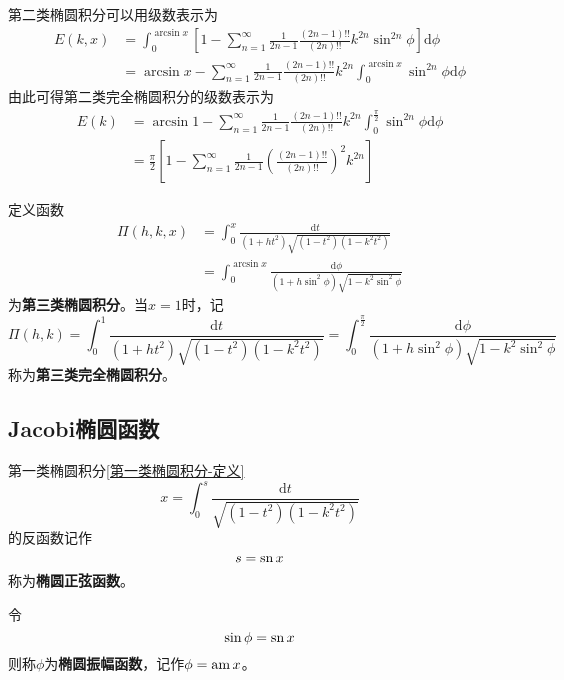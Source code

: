 第二类椭圆积分可以用级数表示为
\begin{align}
	E(k,x) & = \int_0^{\arcsin x} \left[1-\sum_{n=1}^\infty \frac{1}{2n-1}\frac{(2n-1)!!}{(2n)!!}k^{2n}\sin^{2n}\phi\right]\mathrm{d}\phi \nonumber \\
	& = \arcsin x - \sum_{n=1}^\infty \frac{1}{2n-1}\frac{(2n-1)!!}{(2n)!!}k^{2n}\int_0^{\arcsin x} \sin^{2n}\phi \mathrm{d}\phi
	\label{第二类椭圆积分-级数表示}
\end{align}
由此可得第二类完全椭圆积分的级数表示为
\begin{align}
	E(k) & = \arcsin 1 - \sum_{n=1}^\infty \frac{1}{2n-1}\frac{(2n-1)!!}{(2n)!!}k^{2n}\int_0^{\frac{\pi}{2}} \sin^{2n}\phi \mathrm{d}\phi \nonumber \\
	& = \frac{\pi}{2}\left[1-\sum_{n=1}^\infty \frac{1}{2n-1}\left(\frac{(2n-1)!!}{(2n)!!}\right)^2k^{2n}\right]
	\label{chp6:第二类完全椭圆积分-级数表示}
\end{align}

定义函数
\begin{align}
	\varPi(h,k,x) & = \int_0^x \frac{\mathrm{d}t}{(1+ht^2)\sqrt{(1-t^2)(1-k^2t^2)}} \nonumber \\
	& = \int_0^{\arcsin x} \frac{\mathrm{d}\phi}{(1+h\sin^2\phi)\sqrt{1-k^2\sin^2\phi}}
\end{align}
为{\bf 第三类椭圆积分}。当$x=1$时，记
\begin{equation}
	\varPi(h,k) = \int_0^1 \frac{\mathrm{d}t}{(1+ht^2)\sqrt{(1-t^2)(1-k^2t^2)}} = \int_0^{\frac{\pi}{2}} \frac{\mathrm{d}\phi}{(1+h\sin^2\phi)\sqrt{1-k^2\sin^2\phi}}
\end{equation}
称为{\bf 第三类完全椭圆积分}。

\subsection{Jacobi椭圆函数}

第一类椭圆积分\eqref{第一类椭圆积分-定义}
\begin{equation*}
	x = \int_0^s \frac{\mathrm{d}t}{\sqrt{(1-t^2)(1-k^2t^2)}}
\end{equation*}
的反函数记作
\begin{equation}
	s = \mathrm{sn}\, x
\end{equation}
称为{\bf 椭圆正弦函数}。

令
\begin{equation}
	\sin \phi = \mathrm{sn}\, x
\end{equation}
则称$\phi$为{\bf 椭圆振幅函数}，记作$\phi = \mathrm{am}\, x$。

